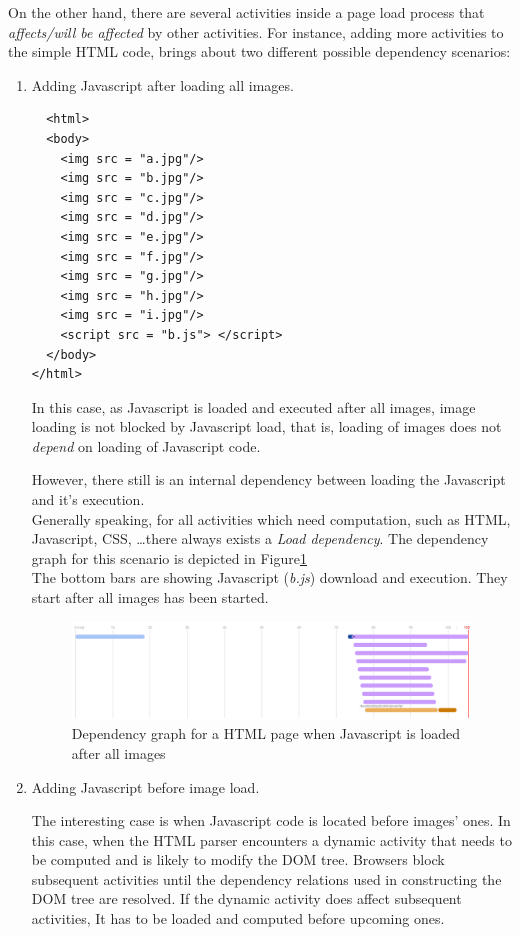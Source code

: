 \noindent On the other hand, there are several activities inside a page load process that {
\em affects/will be affected} by other activities. 
For instance, adding more activities to the simple HTML code, brings about two different possible dependency scenarios:
\begin{enumerate}
  \item Adding Javascript after loading all images. 
   \begin{verbatim}
  <html>
  <body>
    <img src = "a.jpg"/>
    <img src = "b.jpg"/>
    <img src = "c.jpg"/>
    <img src = "d.jpg"/>
    <img src = "e.jpg"/>
    <img src = "f.jpg"/>
    <img src = "g.jpg"/>
    <img src = "h.jpg"/>
    <img src = "i.jpg"/>
    <script src = "b.js"> </script>
  </body>
</html>
\end{verbatim}
  In this case, as Javascript is loaded and executed after all images, image loading is not blocked by Javascript load, that is,  loading of images does not {\em depend} on loading of Javascript code.
  
However, there still is an internal dependency between loading the Javascript and it's execution.\\

Generally speaking, for all activities which need computation, such as HTML, Javascript, CSS, \dots  there always exists a {\em Load dependency}.
The dependency graph for this scenario is depicted in Figure\ref{fig:imagejs}\\ 
The bottom bars are showing Javascript ({\em b.js}) download and execution. They start after all images has been started.
 
 \begin{figure}[!htb]
  \centering
    \includegraphics[width=0.85 \textwidth]{./figures/introduction/imagejs.pdf}
  \caption {Dependency graph for a HTML page when Javascript is loaded after all images}
  \label{fig:imagejs}
\end{figure}


  \item Adding Javascript before image load. 
  
  The interesting case is when Javascript code is located before images' ones.
  In this case, when the HTML parser encounters a dynamic activity that needs to be computed and is likely to modify the DOM tree. Browsers block subsequent activities until the dependency relations used in constructing the DOM tree are resolved. 
 If the dynamic activity does affect subsequent activities, It has to be loaded and computed before upcoming ones. 
 

\end{enumerate}
